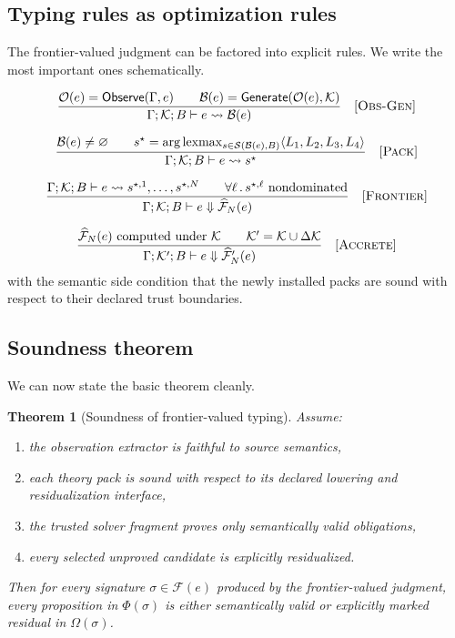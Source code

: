 \documentclass[11pt]{article}
\theoremstyle{definition}
\theoremstyle{plain}
\newtheorem{theorem}[definition]{Theorem}
\begin{document}
\subsection{Typing rules as optimization rules}
The frontier-valued judgment can be factored into explicit rules. We write the
most important ones schematically.

\[
\frac{
  \mathcal{O}(e) = \mathsf{Observe}(\Gamma,e)
  \qquad
  \mathcal{B}(e) = \mathsf{Generate}(\mathcal{O}(e), \mathcal{K})
}{
  \Gamma ; \mathcal{K} ; B \vdash e \rightsquigarrow \mathcal{B}(e)
}
\quad [\textsc{Obs-Gen}]
\]

\[
\frac{
  \mathcal{B}(e) \neq \varnothing
  \qquad
  s^\star = \arg\mathrm{lexmax}_{s \in \mathcal{S}(\mathcal{B}(e),B)} \langle L_1,L_2,L_3,L_4 \rangle
}{
  \Gamma ; \mathcal{K} ; B \vdash e \rightsquigarrow s^\star
}
\quad [\textsc{Pack}]
\]

\[
\frac{
  \Gamma ; \mathcal{K} ; B \vdash e \rightsquigarrow s^{\star,1}, \ldots, s^{\star,N}
  \qquad
  \forall \ell\, .\, s^{\star,\ell} \text{ nondominated}
}{
  \Gamma ; \mathcal{K} ; B \vdash e \Downarrow \widehat{\mathcal{F}}_N(e)
}
\quad [\textsc{Frontier}]
\]

\[
\frac{
  \widehat{\mathcal{F}}_N(e) \text{ computed under } \mathcal{K}
  \qquad
  \mathcal{K}' = \mathcal{K} \cup \Delta \mathcal{K}
}{
  \Gamma ; \mathcal{K}' ; B \vdash e \Downarrow \widehat{\mathcal{F}}'_N(e)
}
\quad [\textsc{Accrete}]
\]
with the semantic side condition that the newly installed packs are sound with
respect to their declared trust boundaries.

\subsection{Soundness theorem}
We can now state the basic theorem cleanly.

\begin{theorem}[Soundness of frontier-valued typing]
Assume:
\begin{enumerate}[label=\arabic*.]
  \item the observation extractor is faithful to source semantics,
  \item each theory pack is sound with respect to its declared lowering and
  residualization interface,
  \item the trusted solver fragment proves only semantically valid obligations,
  \item every selected unproved candidate is explicitly residualized.
\end{enumerate}
Then for every signature $\sigma \in \mathcal{F}(e)$ produced by the
frontier-valued judgment, every proposition in $\Phi(\sigma)$ is either
semantically valid or explicitly marked residual in $\Omega(\sigma)$.
\end{theorem}
\end{document}
